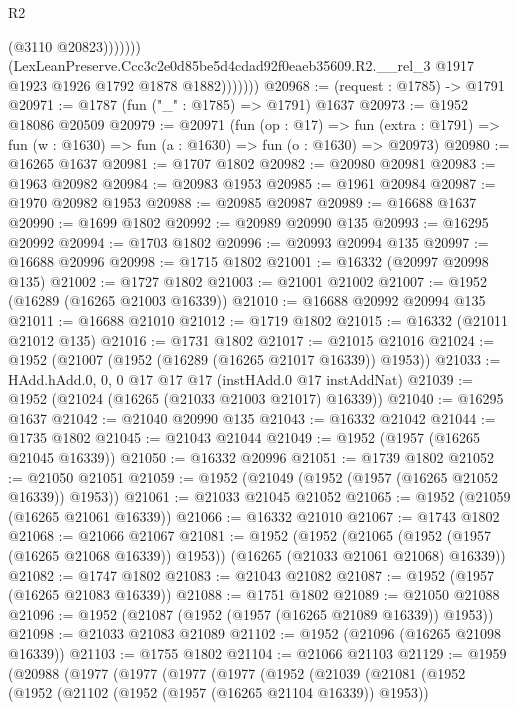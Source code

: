\begin{lexlean}{R2}
\begin{coremodule}
                            (@3110 @20823)))))))
                (LexLeanPreserve.Ccc3c2e0d85be5d4cdad92f0eaeb35609.R2.__rel_3
                  @1917
                  @1923
                  @1926
                  @1792
                  @1878
                  @1882)))))))
@20968 := (request : @1785) -> @1791
@20971 := @1787 (fun ("_" : @1785) => @1791) @1637
@20973 := @1952 @18086 @20509
@20979 := @20971
    (fun (op : @17) =>
    fun (extra : @1791) => fun (w : @1630) => fun (a : @1630) => fun (o : @1630) => @20973)
@20980 := @16265 @1637
@20981 := @1707 @1802
@20982 := @20980 @20981
@20983 := @1963 @20982
@20984 := @20983 @1953
@20985 := @1961 @20984
@20987 := @1970 @20982 @1953
@20988 := @20985 @20987
@20989 := @16688 @1637
@20990 := @1699 @1802
@20992 := @20989 @20990 @135
@20993 := @16295 @20992
@20994 := @1703 @1802
@20996 := @20993 @20994 @135
@20997 := @16688 @20996
@20998 := @1715 @1802
@21001 := @16332 (@20997 @20998 @135)
@21002 := @1727 @1802
@21003 := @21001 @21002
@21007 := @1952 (@16289 (@16265 @21003 @16339))
@21010 := @16688 @20992 @20994 @135
@21011 := @16688 @21010
@21012 := @1719 @1802
@21015 := @16332 (@21011 @21012 @135)
@21016 := @1731 @1802
@21017 := @21015 @21016
@21024 := @1952 (@21007 (@1952 (@16289 (@16265 @21017 @16339)) @1953))
@21033 := HAdd.hAdd.{0, 0, 0} @17 @17 @17 (instHAdd.{0} @17 instAddNat)
@21039 := @1952 (@21024 (@16265 (@21033 @21003 @21017) @16339))
@21040 := @16295 @1637
@21042 := @21040 @20990 @135
@21043 := @16332 @21042
@21044 := @1735 @1802
@21045 := @21043 @21044
@21049 := @1952 (@1957 (@16265 @21045 @16339))
@21050 := @16332 @20996
@21051 := @1739 @1802
@21052 := @21050 @21051
@21059 := @1952 (@21049 (@1952 (@1957 (@16265 @21052 @16339)) @1953))
@21061 := @21033 @21045 @21052
@21065 := @1952 (@21059 (@16265 @21061 @16339))
@21066 := @16332 @21010
@21067 := @1743 @1802
@21068 := @21066 @21067
@21081 := @1952
    (@1952
      (@21065 (@1952 (@1957 (@16265 @21068 @16339)) @1953))
      (@16265 (@21033 @21061 @21068) @16339))
@21082 := @1747 @1802
@21083 := @21043 @21082
@21087 := @1952 (@1957 (@16265 @21083 @16339))
@21088 := @1751 @1802
@21089 := @21050 @21088
@21096 := @1952 (@21087 (@1952 (@1957 (@16265 @21089 @16339)) @1953))
@21098 := @21033 @21083 @21089
@21102 := @1952 (@21096 (@16265 @21098 @16339))
@21103 := @1755 @1802
@21104 := @21066 @21103
@21129 := @1959
    (@20988
      (@1977
        (@1977
          (@1977
            (@1977
              (@1952
                (@21039
                  (@21081
                    (@1952
                      (@1952
                        (@21102 (@1952 (@1957 (@16265 @21104 @16339)) @1953))

\end{coremodule}
\end{lexlean}
